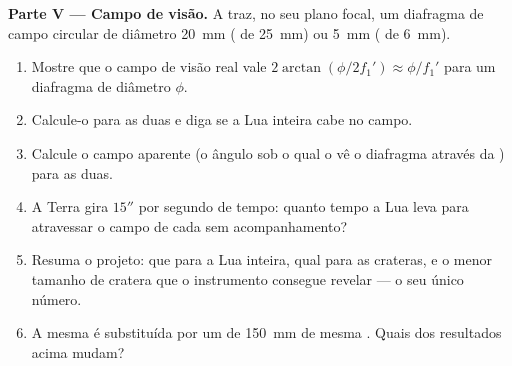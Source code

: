 \begin{problem}
\medskip
\noindent\textbf{Parte V --- Campo de visão.}
A  traz, no seu plano focal, um diafragma de campo circular de
diâmetro \qty{20}{mm} ( de \qty{25}{mm}) ou \qty{5}{mm}
( de \qty{6}{mm}).
\begin{enumerate}[resume]
  \item Mostre que o campo de visão real vale $2\arctan(\phi/2f_1')
        \approx \phi/f_1'$ para um diafragma de diâmetro $\phi$.
  \item Calcule-o para as duas  e diga se a Lua inteira
        cabe no campo.
  \item Calcule o campo aparente (o ângulo sob o qual o  vê
        o diafragma através da ) para as duas.
  \item A Terra gira $15''$ por segundo de tempo: quanto tempo a
        Lua leva para atravessar o campo de cada  sem acompanhamento?
  \item Resuma o projeto: que  para a Lua inteira, qual
        para as crateras, e o menor tamanho de cratera que o instrumento consegue
        revelar --- o seu único número.
  \item A mesma  é substituída por um  de \qty{150}{mm}
        de mesma . Quais dos resultados acima mudam?
\end{enumerate}
\end{problem}
